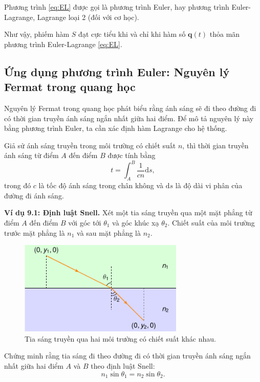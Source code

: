 Phương trình \eqref{eq:EL} được gọi là phương trình Euler, hay phương trình Euler-Lagrange, Lagrange loại 2 (đối với cơ học). 

Như vậy, phiếm hàm \(S\) đạt cực tiểu khi và chỉ khi hàm số \(\mathbf{q}(t)\) thỏa mãn phương trình Euler-Lagrange \eqref{eq:EL}.

\subsection{Ứng dụng phương trình Euler: Nguyên lý Fermat trong quang học}

Nguyên lý Fermat trong quang học phát biểu rằng ánh sáng sẽ đi theo đường đi có thời gian truyền ánh sáng ngắn nhất giữa hai điểm. Để mô tả nguyên lý này bằng phương trình Euler, ta cần xác định hàm Lagrange cho hệ thống.

Giả sử ánh sáng truyền trong môi trường có chiết suất \(n\), thì thời gian truyền ánh sáng từ điểm \(A\) đến điểm \(B\) được tính bằng
\begin{equation}
    t = \int_{A}^{B} \frac{1}{c n}\mathrm{d}s,
\end{equation}
trong đó \(c\) là tốc độ ánh sáng trong chân không và \(\mathrm{d}s\) là độ dài vi phân của đường đi ánh sáng.

\textbf{Ví dụ 9.1: Định luật Snell.} Xét một tia sáng truyền qua một mặt phẳng từ điểm \(A\) đến điểm \(B\) với góc tới \(\theta_1\) và góc khúc xạ \(\theta_2\). Chiết suất của môi trường trước mặt phẳng là \(n_1\) và sau mặt phẳng là \(n_2\). 

\begin{figure}[!h]
    \centering
    \includegraphics[width=0.7\textwidth]{Tuan9/Figures/Snell_law.pdf}
    \caption{Tia sáng truyền qua hai môi trường có chiết suất khác nhau.}
    \label{fig:Snell_law}
\end{figure}
Chứng minh rằng tia sáng đi theo đường đi có thời gian truyền ánh sáng ngắn nhất giữa hai điểm \(A\) và \(B\) theo định luật Snell:
\begin{equation}
    n_1 \sin \theta_1 = n_2 \sin \theta_2.
\end{equation}

